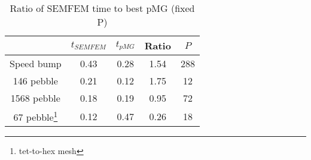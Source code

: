 \begin{table}
\centering
\begin{tabular}{||c |c c c c||}
\hline
& $t_{SEMFEM}$ & $t_{pMG}$ & Ratio & $P$ \\
\hline
Speed bump & 0.43 & 0.28 & 1.54 & 288 \\
146 pebble & 0.21 & 0.12 & 1.75 & 12 \\
1568 pebble & 0.18 & 0.19 & 0.95 & 72 \\
67 pebble\footnote{tet-to-hex mesh} & 0.12 & 0.47 & 0.26 & 18 \\
\hline
\end{tabular}
\caption{
  Ratio of SEMFEM time to best pMG (fixed P)
  \label{table:solver-time-ratio}
}
\end{table}
